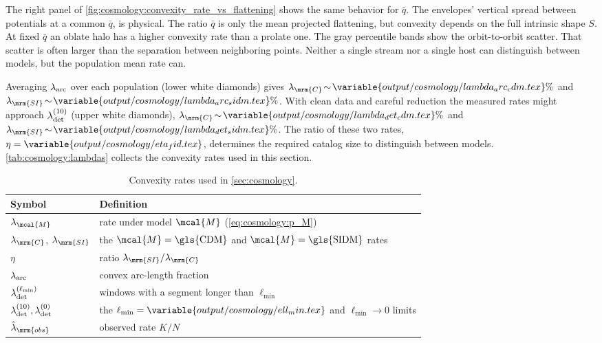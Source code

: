 \documentclass[linenumbers,twocolumn]{aastex701}
\newcommand{\lamM}{\ensuremath{\lambda_{\mcal{M}}}}   %
\newcommand{\lamC}{\ensuremath{\lambda_{\mrm{C}}}}    %
\newcommand{\lamSI}{\ensuremath{\lambda_{\mrm{SI}}}}  %
\newcommand{\lamObs}{\ensuremath{\hat{\lambda}_{\mrm{obs}}}}  %
\newcommand{\lamdadet}[1]{\ensuremath{\lambda_{\rm det}^{({#1})}}}
\begin{document}
        The right panel of \autoref{fig:cosmology:convexity_rate_vs_flattening} shows the same behavior for $\bar{q}$. %
        The envelopes' vertical spread between potentials at a common $\bar{q}$, is physical. %
        The ratio $\bar{q}$ is only the mean projected flattening, but convexity depends on the full intrinsic shape $S$. %
        At fixed $\bar{q}$ an oblate halo has a higher convexity rate than a prolate one. %
        The gray percentile bands show the orbit-to-orbit scatter. %
        That scatter is often larger than the separation between neighboring points. %
        Neither a single stream nor a single host can distinguish between models, but the population mean rate can. %

        Averaging $\lambda_{\rm arc}$ over each population (lower white diamonds) gives $\lamC\!\sim\!\variable{output/cosmology/lambda_arc_cdm.tex}\%$ and $\lamSI\!\sim\!\variable{output/cosmology/lambda_arc_sidm.tex}\%$. %
        With clean data and careful reduction the measured rates might approach $\lamdadet{10}$ (upper white diamonds), $\lamC\!\sim\!\variable{output/cosmology/lambda_det_cdm.tex}\%$ and $\lamSI\!\sim\!\variable{output/cosmology/lambda_det_sidm.tex}\%$. %
        The ratio of these two rates, $\eta=\variable{output/cosmology/eta_fid.tex}$, determines the required catalog size to distinguish between models. %
        \autoref{tab:cosmology:lambdas} collects the convexity rates used in this section. %
        \begin{table}[htbp]
            \centering
            \caption{Convexity rates used in \autoref{sec:cosmology}.}
            \label{tab:cosmology:lambdas}
            \footnotesize
            \renewcommand{\arraystretch}{1.1}%
            \begin{tabular*}{\columnwidth}{@{\extracolsep{\fill}}ll}
                \hline\hline
                Symbol & Definition \\
                \hline
                $\lamM$ & rate under model $\mcal{M}$ (\cref{eq:cosmology:p_M}) \\
                $\lamC$, $\lamSI$ & the $\mcal{M}=\text{\gls{CDM}}$ and $\mcal{M}=\text{\gls{SIDM}}$ rates \\
                $\eta$ & ratio $\lamSI/\lamC$ \\[2pt]
                $\lambda_{\rm arc}$ & convex arc-length fraction \\
                $\lamdadet{\ell_{\min}}$ & windows with a segment longer than $\ell_{\min}$ \\
                $\lamdadet{10}, \lamdadet{0}$ & the $\ell_{\min}=\variable{output/cosmology/ell_min.tex}$ and $\ell_{\min}\to 0$ limits \\[2pt]
                $\lamObs$ & observed rate $K/N$ \\
                \hline
            \end{tabular*}
        \end{table}
\end{document}

